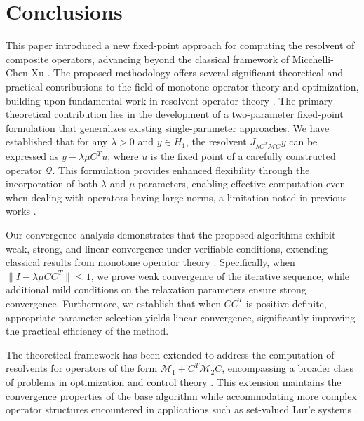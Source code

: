 \documentclass[11pt]{article}
\theoremstyle{plain}
\begin{document}
{\section{Conclusions}\label{sec5}
{This paper  introduced a new fixed-point approach for computing the resolvent of composite operators, advancing beyond the classical framework of Micchelli-Chen-Xu \cite{Micchelli,Micchelli1,Moudafi}. The proposed methodology offers several significant theoretical and practical contributions to the field of monotone operator theory and optimization, building upon fundamental work in resolvent operator theory \cite{Bauschke,Robinson}. The primary theoretical contribution lies in the development of a two-parameter fixed-point formulation that generalizes existing single-parameter approaches. We have established that for any $\lambda > 0$ and $y \in H_1$, the resolvent $J_{\lambda C^T\mathcal{M}C}y$ can be expressed as $y - \lambda\mu C^Tu$, where $u$ is the fixed point of a carefully constructed operator $\mathcal{Q}$. This formulation provides enhanced flexibility through the incorporation of both $\lambda$ and $\mu$ parameters, enabling effective computation even when dealing with operators having large norms, a limitation noted in previous works \cite{chen,Moudafi}.}

{Our convergence analysis demonstrates that the proposed algorithms exhibit weak, strong, and linear convergence under verifiable conditions, extending classical results from monotone operator theory \cite{IT,Tseng}. Specifically, when $\|I - \lambda\mu CC^T\| \leq 1$, we prove weak convergence of the iterative sequence, while additional mild conditions on the relaxation parameters ensure strong convergence. Furthermore, we establish that when $CC^T$ is positive definite, appropriate parameter selection yields linear convergence, significantly improving the practical efficiency of the method.}

{The theoretical framework has been extended to address the computation of resolvents for operators of the form $\mathcal{M}_1 + C^T\mathcal{M}_2C$, encompassing a broader class of problems in optimization and control theory \cite{ab,Attouch0}. This extension maintains the convergence properties of the base algorithm while accommodating more complex operator structures encountered in applications such as set-valued Lur'e systems \cite{ahl2,br0,BT}.}

}
\end{document}
